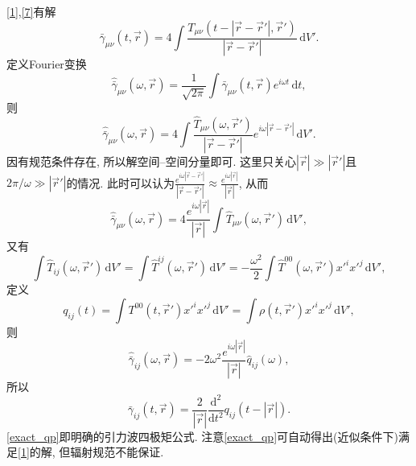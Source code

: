 \documentclass[12pt]{ctexart}
\def\d{\mathrm{d}}
\begin{document}
\eqref{1},\eqref{7}有解\cite{Wald1984}
\begin{equation}
    \bar{\gamma}_{\mu\nu}(t,\vec{r})=4\int\frac{T_{\mu\nu}(t-\left\lvert\vec{r}-\vec{r}'\right\rvert,\vec{r}')}{\left\lvert\vec{r}-\vec{r}'\right\rvert}\,\d V'.\label{10}
\end{equation}
定义Fourier变换
\begin{equation}
    \hat{\bar{\gamma}}_{\mu\nu}(\omega,\vec{r})=\frac{1}{\sqrt{2\pi}}\int\bar{\gamma}_{\mu\nu}(t,\vec{r})e^{i\omega t}\,\d t,
\end{equation}
则
\begin{equation}
    \hat{\bar{\gamma}}_{\mu\nu}(\omega,\vec{r})=4\int\frac{\hat{T}_{\mu\nu}(\omega,\vec{r}')}{\left\lvert\vec{r}-\vec{r}'\right\rvert}e^{i\omega\left\lvert\vec{r}-\vec{r}'\right\rvert}\,\d V'.\label{12}
\end{equation}
因有规范条件存在, 所以解空间--空间分量即可. 这里只关心$\left\lvert\vec{r}\right\rvert\gg\left\lvert\vec{r}'\right\rvert$且$2\pi/\omega\gg\left\lvert\vec{r}'\right\rvert$的情况. 此时可以认为$\frac{e^{i\omega\left\lvert\vec{r}-\vec{r}'\right\rvert}}{\left\lvert\vec{r}-\vec{r}'\right\rvert}\approx\frac{e^{i\omega\left\lvert\vec{r}\right\rvert}}{\left\lvert\vec{r}\right\rvert}$, 从而
\begin{equation}
    \hat{\bar{\gamma}}_{\mu\nu}(\omega,\vec{r})=4\frac{e^{i\omega\left\lvert\vec{r}\right\rvert}}{\left\lvert\vec{r}\right\rvert}\int\hat{T}_{\mu\nu}(\omega,\vec{r}')\,\d V',\label{13}
\end{equation}
又有\cite{Wald1984}
\begin{equation}
    \int\hat{T}_{ij}(\omega,\vec{r}')\,\d V'=\int\hat{T}^{ij}(\omega,\vec{r}')\,\d V'=-\frac{\omega^2}{2}\int\hat{T}^{00}(\omega,\vec{r}')x'^{i}x'^{j}\,\d V',
\end{equation}
定义
\begin{equation}
    q_{ij}(t)=\int T^{00}(t,\vec{r}')x'^{i}x'^{j}\,\d V'=\int\rho(t,\vec{r}')x'^{i}x'^{j}\,\d V',
\end{equation}
则
\begin{equation}
    \hat{\bar{\gamma}}_{ij}(\omega,\vec{r})=-2\omega^2\frac{e^{i\omega\left\lvert\vec{r}\right\rvert}}{\left\lvert\vec{r}\right\rvert}\hat{q}_{ij}(\omega),
\end{equation}
所以
\begin{equation}
    \bar{\gamma}_{ij}(t,\vec{r})=\frac{2}{\left\lvert\vec{r}\right\rvert}\frac{\d^2}{\d t^2}{q}_{ij}(t-\left\lvert\vec{r}\right\rvert).\label{exact_qp}
\end{equation}
\eqref{exact_qp}即明确的引力波四极矩公式. 注意\eqref{exact_qp}可自动得出(近似条件下)满足\eqref{1}的解, 但辐射规范不能保证\cite{Wald1984}.
\end{document}

